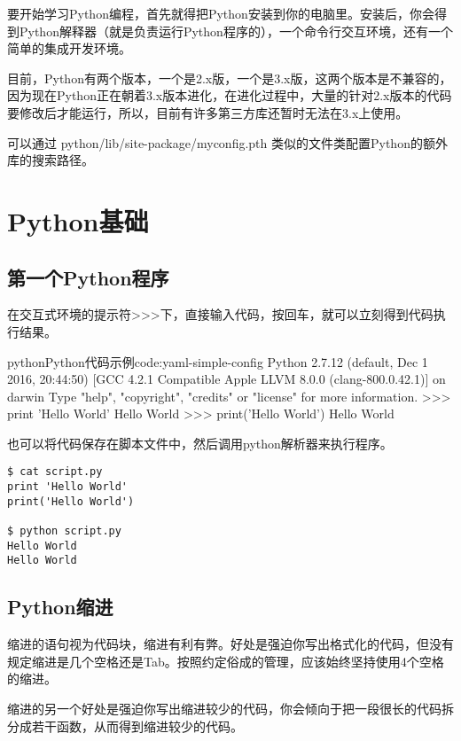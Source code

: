 要开始学习Python编程，首先就得把Python安装到你的电脑里。安装后，你会得到Python解释器（就是负责运行Python程序的），一个命令行交互环境，还有一个简单的集成开发环境。

目前，Python有两个版本，一个是2.x版，一个是3.x版，这两个版本是不兼容的，因为现在Python正在朝着3.x版本进化，在进化过程中，大量的针对2.x版本的代码要修改后才能运行，所以，目前有许多第三方库还暂时无法在3.x上使用。

可以通过 python/lib/site-package/myconfig.pth 类似的文件类配置Python的额外库的搜索路径。


\section{Python基础}

\subsection{第一个Python程序}
在交互式环境的提示符>>>下，直接输入代码，按回车，就可以立刻得到代码执行结果。
\begin{jcode}{python}{Python代码示例}{code:yaml-simple-config}
Python 2.7.12 (default, Dec  1 2016, 20:44:50) 
[GCC 4.2.1 Compatible Apple LLVM 8.0.0 (clang-800.0.42.1)] on darwin
Type "help", "copyright", "credits" or "license" for more information.
>>> print 'Hello World'
Hello World
>>> print('Hello World')
Hello World
\end{jcode}

也可以将代码保存在脚本文件中，然后调用python解析器来执行程序。
\begin{verbatim}
$ cat script.py
print 'Hello World'
print('Hello World')

$ python script.py
Hello World
Hello World
\end{verbatim}

\subsection{Python缩进}
缩进的语句视为代码块，缩进有利有弊。好处是强迫你写出格式化的代码，但没有规定缩进是几个空格还是Tab。按照约定俗成的管理，应该始终坚持使用4个空格的缩进。

缩进的另一个好处是强迫你写出缩进较少的代码，你会倾向于把一段很长的代码拆分成若干函数，从而得到缩进较少的代码。

